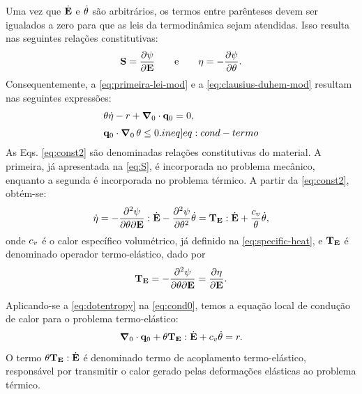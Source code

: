 \documentclass[Tese.tex]{subfiles}
\begin{document}
Uma vez que $\dot{\mathbf{E}}$ e $\dot{\theta}$ são arbitrários, os termos entre parênteses devem ser igualados a zero para que as leis da termodinâmica sejam atendidas. Isso resulta nas seguintes relações constitutivas:
\begin{equation}
\mathbf{S} = \dfrac{\partial \psi}{\partial \mathbf{E}} \text{\qquad e\qquad} \eta=-\dfrac{\partial \psi}{\partial \theta}.\label{eq:const2} 
\end{equation}
Consequentemente, a \cref{eq:primeira-lei-mod} e a \cref{eq:clausius-duhem-mod} resultam nas seguintes expressões:
\begin{align}{ }
&
\temp \dotentropy - \calorInt + \gradientei\cdot\qi = 0, \label{eq:cond0}
\\[0.1cm]
&
\qi\cdot\gradientei\,\temp \leq 0. \label[ineq]{eq:cond-termo}
\end{align}
As Eqs. \eqref{eq:const2} são denominadas relações constitutivas do material. A primeira, já apresentada na \cref{eq:S}, é incorporada no problema mecânico, enquanto a segunda é incorporada no problema térmico. A partir da \cref{eq:const2}, obtém-se:
\begin{equation}\label{eq:dotentropy}
\dot{\eta} = -\dfrac{\partial^2 \psi}{\partial \theta \partial\mathbf{E}}:\dot{\mathbf{E}} - \dfrac{\partial^2 \psi}{\partial \theta^2}\dot{\theta} = \mathbf{T}_{\mathbf{E}}:\dot{\mathbf{E}} + \dfrac{c_v}{\theta}\dot{\theta},
\end{equation}
onde $c_v$ é o calor específico volumétrico, já definido na \cref{eq:specific-heat}, e $\mathbf{T}_{\mathbf{E}}$ é denominado operador termo-elástico, dado por
\begin{equation}
\mathbf{T}_{\mathbf{E}} = -\dfrac{\partial^2 \psi}{\partial \theta \partial\mathbf{E}} = \dfrac{\partial\eta}{\partial\mathbf{E}}.
\end{equation}

Aplicando-se a \cref{eq:dotentropy} na \cref{eq:cond0}, temos a equação local de condução de calor para o problema termo-elástico:
\begin{equation}\label{eq:equacao-conducao-local}
\boldsymbol{\nabla}_0\cdot\mathbf{q}_0 + \theta\mathbf{T}_{\mathbf{E}}:\dot{\mathbf{E}} + c_v\dot{\theta} = r.
\end{equation}
O termo $\theta\mathbf{T}_{\mathbf{E}}:\dot{\mathbf{E}}$ é denominado termo de acoplamento termo-elástico, responsável por transmitir o calor gerado pelas deformações elásticas ao problema térmico.
\end{document}

